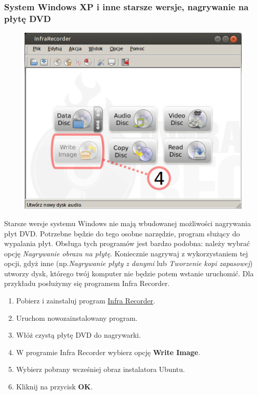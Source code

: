 \subsubsection{System Windows XP i inne starsze wersje, nagrywanie na płytę DVD}
\begin{figure}
		\includegraphics[width=\linewidth]{images/instalacja_nagrywanie_obrazu_DVD_winXP.png}
\end{figure}
Starsze wersje systemu Windows nie mają wbudowanej możliwości nagrywania płyt DVD. Potrzebne będzie do tego osobne narzędzie, program służący do wypalania płyt. Obsługa tych programów jest bardzo podobna: należy wybrać opcję \emph{Nagrywanie obrazu na płytę}. Koniecznie nagrywaj z wykorzystaniem tej opcji, gdyż inne (np.\emph{Nagrywanie płyty z danymi} lub \emph{Tworzenie kopi zapasowej}) utworzy dysk, którego twój komputer nie będzie potem wstanie uruchomić. Dla przykładu posłużymy się programem Infra Recorder.

\begin{enumerate}
\item Pobierz i zainstaluj program \href{http://infrarecorder.org/?page_id=5}{Infra Recorder}.
\item Uruchom nowozainstalowany program.
\item Włóż czystą płytę DVD do nagrywarki.
\item W programie Infra Recorder wybierz opcję \textbf{Write Image}.
\item Wybierz pobrany wcześniej obraz instalatora Ubuntu.
\item Kliknij na przycisk \textbf{OK}.
\end{enumerate}











